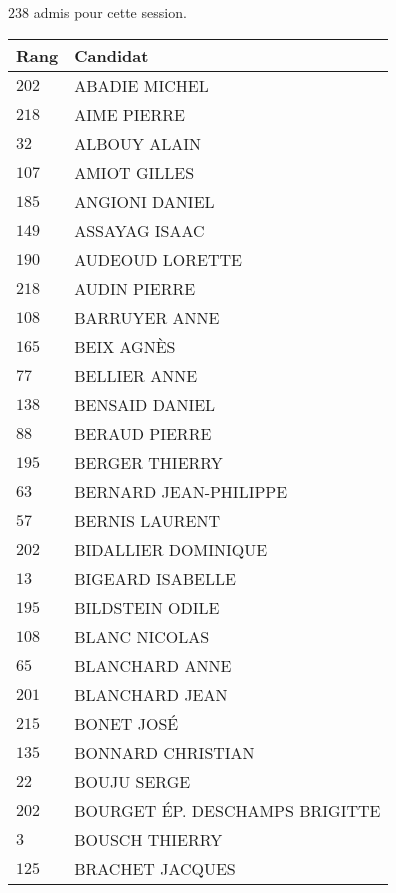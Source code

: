 




  $238$ admis pour cette session.

  \begin{xltabular}{\linewidth}{|l|X|}
    \hline
    \textbf{Rang} & \textbf{Candidat} \\
    \hline
    $202$ & ABADIE MICHEL \\
    \hline
    $218$ & AIME PIERRE \\
    \hline
    $32$ & ALBOUY ALAIN \\
    \hline
    $107$ & AMIOT GILLES \\
    \hline
    $185$ & ANGIONI DANIEL \\
    \hline
    $149$ & ASSAYAG ISAAC \\
    \hline
    $190$ & AUDEOUD LORETTE \\
    \hline
    $218$ & AUDIN PIERRE \\
    \hline
    $108$ & BARRUYER ANNE \\
    \hline
    $165$ & BEIX AGNÈS \\
    \hline
    $77$ & BELLIER ANNE \\
    \hline
    $138$ & BENSAID DANIEL \\
    \hline
    $88$ & BERAUD PIERRE \\
    \hline
    $195$ & BERGER THIERRY \\
    \hline
    $63$ & BERNARD JEAN-PHILIPPE \\
    \hline
    $57$ & BERNIS LAURENT \\
    \hline
    $202$ & BIDALLIER DOMINIQUE \\
    \hline
    $13$ & BIGEARD ISABELLE \\
    \hline
    $195$ & BILDSTEIN ODILE \\
    \hline
    $108$ & BLANC NICOLAS \\
    \hline
    $65$ & BLANCHARD ANNE \\
    \hline
    $201$ & BLANCHARD JEAN \\
    \hline
    $215$ & BONET JOSÉ \\
    \hline
    $135$ & BONNARD CHRISTIAN \\
    \hline
    $22$ & BOUJU SERGE \\
    \hline
    $202$ & BOURGET ÉP. DESCHAMPS BRIGITTE \\
    \hline
    $3$ & BOUSCH THIERRY \\
    \hline
    $125$ & BRACHET JACQUES \\

\end{xltabular}
